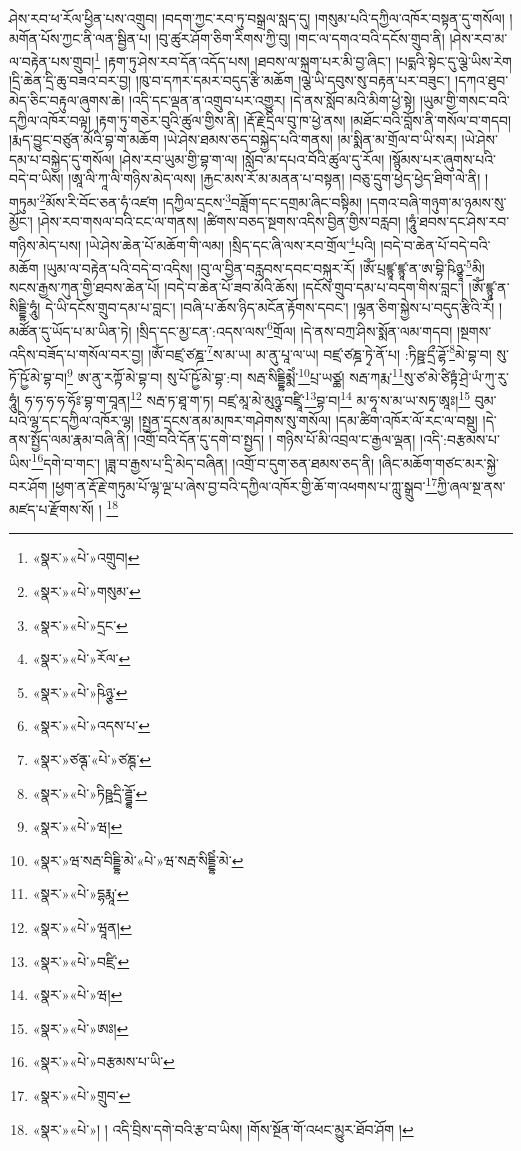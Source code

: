 ཤེས་རབ་ཕ་རོལ་ཕྱིན་པས་འགྲུབ། །བདག་ཀྱང་རབ་ཏུ་བསྒྲལ་སླད་དུ། །གསུམ་པའི་དཀྱིལ་འཁོར་བསྟན་དུ་གསོལ། །མགོན་པོས་ཀྱང་ནི་ལན་སྦྱིན་པ། །བུ་ཚུར་ཤོག་ཅིག་རིགས་ཀྱི་བུ། །གང་ལ་དགའ་བའི་དངོས་གྲུབ་ནི། །ཤེས་རབ་མ་ལ་བརྟེན་པས་གྲུབ།\footnote{«སྣར་»«པེ་»འགྲུབ།} །རྟག་ཏུ་ཤེས་རབ་དོན་འདོད་པས། །ཐབས་ལ་སྐྲག་པར་མི་བྱ་ཞིང་། །པདྨའི་སྟེང་དུ་ལྕེ་ཡིས་རེག །དྲི་ཆེན་དྲི་ཆུ་བཟའ་བར་བྱ། །ཁུ་བ་དཀར་དམར་བདུད་རྩི་མཆོག །ལྕེ་ཡི་དབུས་སུ་བརྟན་པར་བཟུང་། །དཀའ་ཐུབ་མེད་ཅིང་བརྟུལ་ཞུགས་ཆེ། །འདི་དང་ལྡན་ན་འགྲུབ་པར་འགྱུར། །དེ་ནས་སློབ་མའི་མིག་ཕྱེ་སྟེ། །ཡུམ་གྱི་གསང་བའི་དཀྱིལ་འཁོར་བལྟ། །རྟག་ཏུ་གཅེར་བུའི་ཚུལ་གྱིས་ནི། །རྡོ་རྗེ་དྲིལ་བུ་ཁ་ཕྱེ་ནས། །མཐོང་བའི་བློས་ནི་གསོལ་བ་གདབ། །རྨད་བྱུང་བཙུན་མོའི་བྷ་ག་མཆོག །ཡེ་ཤེས་ཐམས་ཅད་བསྐྱེད་པའི་གནས། །མ་སྨིན་མ་གྲོལ་བ་ཡི་སར། །ཡེ་ཤེས་དམ་པ་བསྐྱེད་དུ་གསོལ། །ཤེས་རབ་ཡུམ་གྱི་བྷ་ག་ལ། །སློབ་མ་དཔའ་བོའི་ཚུལ་དུ་རོལ། །སྙོམས་པར་ཞུགས་པའི་བདེ་བ་ཡིས། །ཨཱ་ལི་ཀཱ་ལི་གཉིས་མེད་ལས། །རྐྱང་མས་རོ་མ་མནན་པ་བསྟན། །བཅུ་དྲུག་ཕྱེད་ཕྱེད་ཐིག་ལེ་ནི། །གཏུམ་\footnote{«སྣར་»«པེ་»གསུམ་}མོས་རི་བོང་ཅན་ཧཾ་འཛག །དཀྱིལ་དྲངས་\footnote{«སྣར་»«པེ་»དྲང་}བཟློག་དང་དགྲམ་ཞིང་བསྟིམ། །དགའ་བཞི་གཉུག་མ་ཉམས་སུ་མྱོང་། །ཤེས་རབ་གསལ་བའི་ངང་ལ་གནས། །ཚིགས་བཅད་སྔགས་འདིས་བྱིན་གྱིས་བརླབ། །ཧཱུཾ་ཐབས་དང་ཤེས་རབ་གཉིས་མེད་པས། །ཡེ་ཤེས་ཆེན་པོ་མཆོག་གི་ལམ། །སྲིད་དང་ཞི་ལས་རབ་གྲོལ་\footnote{«སྣར་»«པེ་»རོལ་}པའི། །བདེ་བ་ཆེན་པོ་བདེ་བའི་མཆོག །ཡུམ་ལ་བརྟེན་པའི་བདེ་བ་འདིས། །བུ་ལ་བྱིན་བརླབས་དབང་བསྐུར་རོ། །ཨོཾ་པྲཛྙཱ་ཛྙཱ་ན་ཨ་བྷི་ཥིཉྩཱ་\footnote{«སྣར་»«པེ་»ཥིཉྩ་}མི། སངས་རྒྱས་ཀུན་གྱི་ཐབས་ཆེན་པོ། །བདེ་བ་ཆེན་པོ་ཟབ་མོའི་ཆོས། །དངོས་གྲུབ་དམ་པ་བདག་གིས་བླང་། །ཨོཾ་ཛྙཱ་ན་སིདྡྷི་ཧཱུཾ། དེ་ཡི་དངོས་གྲུབ་དམ་པ་བླང་། །བཞི་པ་ཆོས་ཉིད་མངོན་རྟོགས་དབང་། །ལྷན་ཅིག་སྐྱེས་པ་བདུད་རྩིའི་རོ། །མཚོན་དུ་ཡོད་པ་མ་ཡིན་ཏེ། །སྲིད་དང་མྱ་ངན་:འདས་ལས་\footnote{«སྣར་»«པེ་»འདས་པ་}གྲོལ། །དེ་ནས་བཀྲ་ཤིས་སྨོན་ལམ་གདབ། །སྔགས་འདིས་བཟོད་པ་གསོལ་བར་བྱ། །ཨོཾ་བཛྲ་ཙཎྜ་\footnote{«སྣར་»ཙནྚ་«པེ་»ཙཎྚ་}ས་མ་ཡ། མ་ནུ་པཱ་ལ་ཡ། བཛྲ་ཙཎྜ་ཏྭེ་ནོ་པ། :ཏིཥྛ་དྲྀ་ཌྷོ་\footnote{«སྣར་»«པེ་»ཏིཥྛདྲི་ཌྜྷོ་}མེ་བྷ་བ། སུ་ཏོ་ཥྱོ་མེ་བྷ་བ།\footnote{«སྣར་»«པེ་»ཝ།} ཨ་ནུ་རཀྟོ་མེ་བྷ་བ། སུ་པོ་ཥྱོ་མེ་བྷ་:བ། སརྦ་སིདྡྷིམྨེཾ་\footnote{«སྣར་»ཝ་སརྦ་བིདྡྷི་མེ་«པེ་»ཝ་སརྦ་སིདྡྷིཾ་མེ་}པྲ་ཡཙྪ། སརྦ་ཀརྨ་\footnote{«སྣར་»«པེ་»དྷརྨཱ་}སུ་ཙ་མེ་ཙིཏྟཾ་ཤྲེ་ཡཾ་ཀུ་རུ་ཧཱུཾ། ཧ་ཧ་ཧ་ཧ་ཧོཿ་བྷ་ག་བཱན།\footnote{«སྣར་»«པེ་»ཝཱན།} སརྦ་ཏ་ཐཱ་ག་ཏ། བཛྲ་མཱ་མེ་མུཉྩ་བཛྲཱི་\footnote{«སྣར་»«པེ་»བཛྲི་}བྷ་བ།\footnote{«སྣར་»«པེ་»ཝ།} མ་ཧཱ་ས་མ་ཡ་སཏྭ་ཨཱཿ།\footnote{«སྣར་»«པེ་»ཨཿ།} བུམ་པའི་ལྷ་དང་དཀྱིལ་འཁོར་ལྷ། །སྤྱན་དྲངས་ནམ་མཁར་གཤེགས་སུ་གསོལ། །དམ་ཚིག་འཁོར་ལོ་རང་ལ་བསྡུ། །དེ་ནས་སྤྱོད་ལམ་རྣམ་བཞི་ནི། །འགྲོ་བའི་དོན་དུ་དགེ་བ་སྤྱད། །
གཉིས་པོ་མི་འབྲལ་ང་རྒྱལ་ལྡན། །འདི་:བརྩམས་པ་ཡིས་\footnote{«སྣར་»«པེ་»བརྩམས་པ་ཡི་}དགེ་བ་གང་། །ཟླ་བ་རྒྱས་པ་དྲི་མེད་བཞིན། །འགྲོ་བ་དུག་ཅན་ཐམས་ཅད་ནི། །ཞིང་མཆོག་གཙང་མར་སྐྱེ་བར་ཤོག །ཕྱག་ན་རྡོ་རྗེ་གཏུམ་པོ་ལྷ་ལྔ་པ་ཞེས་བྱ་བའི་དཀྱིལ་འཁོར་གྱི་ཆོ་ག་འཕགས་པ་ཀླུ་སྒྲུབ་\footnote{«སྣར་»«པེ་»གྲུབ་}ཀྱི་ཞལ་སྔ་ནས་མཛད་པ་རྫོགས་སོ། ། \footnote{«སྣར་»«པེ་»། ། འདི་བྲིས་དགེ་བའི་རྩ་བ་ཡིས། །གོས་སྔོན་གོ་འཕང་མྱུར་ཐོབ་ཤོག །}